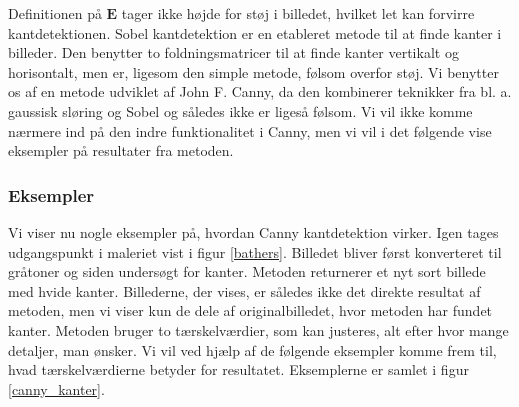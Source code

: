 {Definitionen på $\mathbf{E}$ tager ikke højde for støj i billedet,
hvilket let kan forvirre kantdetektionen. Sobel kantdetektion er en
etableret metode til at finde kanter i billeder. Den benytter to
foldningsmatricer til at finde kanter vertikalt og horisontalt, men er,
ligesom den simple metode, følsom overfor støj. Vi benytter os af en
metode udviklet af John F. Canny, da den kombinerer teknikker fra bl. a.
gaussisk sløring og Sobel\cite{SIOlsen} og således ikke er ligeså
følsom. Vi vil ikke komme nærmere ind på den indre funktionalitet i
Canny, men vi vil i det følgende vise eksempler på resultater fra
metoden.

\subsubsection*{Eksempler}
Vi viser nu nogle eksempler på, hvordan Canny kantdetektion virker. Igen
tages udgangspunkt i maleriet vist i figur \ref{bathers}. Billedet
bliver først konverteret til gråtoner og siden undersøgt for kanter.
Metoden returnerer et nyt sort billede med hvide kanter. Billederne, der
vises, er således ikke det direkte resultat af metoden, men vi viser kun
de dele af originalbilledet, hvor metoden har fundet kanter. Metoden
bruger to tærskelværdier, som kan justeres, alt efter hvor mange
detaljer, man ønsker. Vi vil ved hjælp af de følgende eksempler komme
frem til, hvad tærskelværdierne betyder for resultatet. Eksemplerne er
samlet i figur \ref{canny_kanter}.

}
